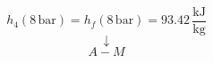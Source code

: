 

\item[c)] 
    \[
    h_4 (8 \, \text{bar}) = h_f (8 \, \text{bar}) = 93.42 \, \frac{\text{kJ}}{\text{kg}}
    \]
    \[
    \downarrow
    \]
    \[
    A-M
    \]